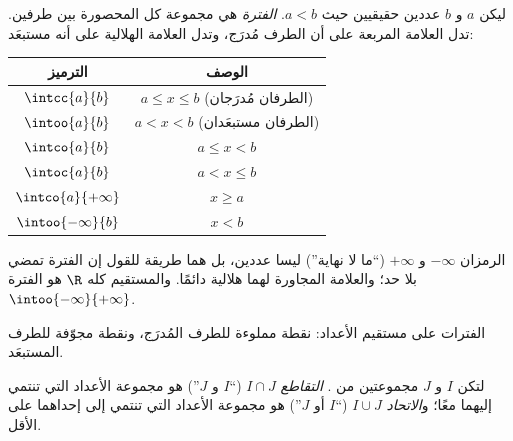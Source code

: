 \begin{definition}[الفترة]\label{def:g10:numbers:interval}
ليكن $a$ و $b$ عددين حقيقيين حيث $a < b$.
\emph{الفترة} هي مجموعة كل  المحصورة بين
طرفين. تدل العلامة المربعة على أن الطرف مُدرَج، وتدل العلامة الهلالية
على أنه مستبعَد:
\begin{center}
\begin{tabular}{c|c}
الترميز & الوصف \\
\hline
$\intcc{a}{b}$ & $a \leq x \leq b$ (الطرفان مُدرَجان) \\
$\intoo{a}{b}$ & $a < x < b$ (الطرفان مستبعَدان) \\
$\intco{a}{b}$ & $a \leq x < b$ \\
$\intoc{a}{b}$ & $a < x \leq b$ \\
$\intco{a}{+\infty}$ & $x \geq a$ \\
$\intoo{-\infty}{b}$ & $x < b$ \\
\end{tabular}
\end{center}
الرمزان $-\infty$ و $+\infty$ (``ما لا نهاية'') ليسا عددين، بل هما
طريقة للقول إن الفترة تمضي بلا حد؛ والعلامة المجاورة لهما هلالية
دائمًا. والمستقيم كله $\R$ هو الفترة
$\intoo{-\infty}{+\infty}$.
\end{definition}

\begin{omfigure}

{\small الفترات على مستقيم الأعداد: نقطة مملوءة للطرف المُدرَج،
ونقطة مجوّفة للطرف المستبعَد.}
\end{omfigure}

\begin{definition}\label{def:g10:numbers:interunion}
لتكن $I$ و $J$ مجموعتين من .
\emph{التقاطع} $I \cap J$ (``$I$ و $J$'')
هو مجموعة الأعداد التي تنتمي إليهما معًا؛ و\emph{الاتحاد}
$I \cup J$ (``$I$ أو $J$'') هو مجموعة الأعداد التي تنتمي إلى إحداهما
على الأقل.
\end{definition}

